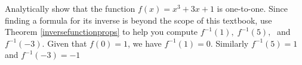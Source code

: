 {Analytically show that the function $f(x) = x^3 + 3x + 1$ is one-to-one.  Since finding a formula for its inverse is beyond the scope of this textbook, use Theorem \ref{inversefunctionprops} to help you compute $f^{-1}(1), \; f^{-1}(5), \;$ and $f^{-1}(-3)$.}
{Given that $f(0) = 1$, we have $f^{-1}(1) = 0$.  Similarly $f^{-1}(5) = 1$ and $f^{-1}(-3) = -1$}